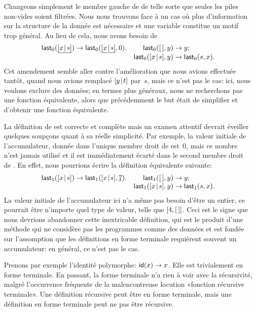 Changeons simplement le membre gauche de  de telle
sorte que seules les piles non-vides soient filtrées. Nous nous
trouvons face à un cas où plus d'information sur la structure de la
donnée est nécessaire et une variable constitue un motif trop
général. Au lieu de cela, nous avons besoin de
\begin{equation*}
\begin{array}{@{}r@{\;}l@{\;}lr@{\;}l@{\;}l@{}}
\fun{last}_0(\underline{\cons{x}{s}}) & \rightarrow &
  \fun{last}_0(\underline{\cons{x}{s}},0). &
\fun{last}_0(\el,y) & \rightarrow & y;\\
&&& \fun{last}_0(\cons{x}{s},y) & \rightarrow & \fun{last}_0(s,x).
\end{array}
\end{equation*}
Cet amendement semble aller contre l'amélioration que nous avions
effectuée tantôt, quand nous avions remplacé \([{y}\!\mid\!{t}]\)
par~\(s\), mais ce n'est pas le cas: ici, nous voulons exclure des
données; en termes plus généraux, nous ne recherchons pas une fonction
équivalente, alors que précédemment le but était de simplifier et
d'obtenir une fonction équivalente.

La définition de  est correcte et complète mais un
examen attentif devrait éveiller quelques soupçons quant à sa réelle
simplicité. Par exemple, la valeur initiale de l'accumulateur, donnée
dans l'unique membre droit de  est~\(0\), mais ce
nombre n'est jamais utilisé et il est immédiatement écarté dans le
second membre droit de . En effet, nous pourrions
écrire la définition équivalente suivante:
\begin{equation*}
\begin{array}{@{}r@{\;}l@{\;}lr@{\;}l@{\;}l@{}}
\fun{last}_1(\cons{x}{s}) & \rightarrow & \fun{last}_1(\cons{x}{s},\underline{7}). &
\fun{last}_1(\el,y) & \rightarrow & y;\\
&&&\fun{last}_1(\cons{x}{s},y) & \rightarrow & \fun{last}_1(s,x).
\end{array}
\end{equation*}
La valeur initiale de l'accumulateur ici n'a même pas besoin d'être un
entier, ce pourrait être n'importe quel type de valeur, telle que
\([4,[\,]]\). Ceci est le signe que nous devrions abandonner cette
inextricable définition, qui est le produit d'une méthode qui ne
considère pas les programmes comme des données et est fondée sur
l'assomption que les définitions en forme terminale requièrent
souvent un accumulateur: en général, ce n'est pas le cas.

Prenons par exemple l'identité polymorphe: \(\textsf{id}(x) \rightarrow
x\). Elle est trivialement en forme terminale. En passant, la forme
terminale n'a rien à voir avec la récursivité, malgré l'occurrence
fréquente de la malencontreuse locution «fonction récursive
terminale». Une définition récursive peut être en forme terminale,
mais une définition en forme terminale peut ne pas être récursive.
